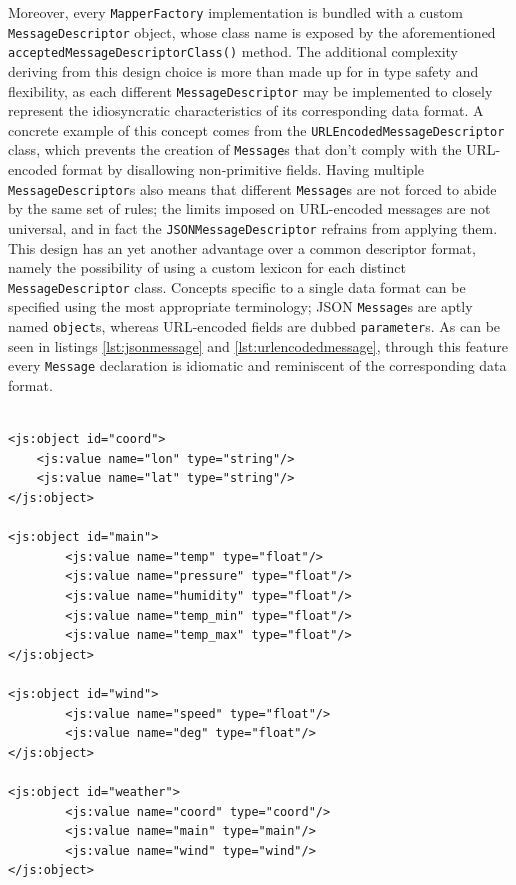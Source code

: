 Moreover, every \texttt{MapperFactory} implementation is bundled with a custom
\texttt{MessageDescriptor} object, whose class name is exposed by the
aforementioned \texttt{acceptedMessageDescriptorClass()} method. The additional
complexity deriving from this design choice is more than made up for in type
safety and flexibility, as each different \texttt{MessageDescriptor} may be
implemented to closely represent the idiosyncratic characteristics of its
corresponding data format. A concrete example of this concept comes from the
\texttt{URLEncodedMessageDescriptor} class, which prevents the creation of
\texttt{Message}s that don't comply with the URL-encoded format by disallowing
non-primitive fields. Having multiple \texttt{MessageDescriptor}s also means
that different \texttt{Message}s are not forced to abide by the same set of
rules; the limits imposed on URL-encoded messages are not universal, and in
fact the \texttt{JSONMessageDescriptor} refrains from applying them. This
design has an yet another advantage over a common descriptor format, namely the
possibility of using a custom lexicon for each distinct
\texttt{MessageDescriptor} class. Concepts specific to a single data format can
be specified using the most appropriate terminology; JSON \texttt{Message}s are
aptly named \texttt{object}s, whereas URL-encoded fields are dubbed
\texttt{parameter}s. As can be seen in listings \ref{lst:jsonmessage} and
\ref{lst:urlencodedmessage}, through this feature every \texttt{Message}
declaration is idiomatic and reminiscent of the corresponding data format. 


\lstset{language=XML}
\begin{lstlisting}[float,floatplacement=!hbt,caption={A compound JSON message
        declared using the JSONMessageDescriptor (XML notation). Note that the
        data type of all fields inside \texttt{weather} message is a reference
        to a previously declared \texttt{Message}.
},label={lst:jsonmessage}]

<js:object id="coord">
    <js:value name="lon" type="string"/>
    <js:value name="lat" type="string"/>
</js:object>

<js:object id="main">
        <js:value name="temp" type="float"/>
        <js:value name="pressure" type="float"/>
        <js:value name="humidity" type="float"/>
        <js:value name="temp_min" type="float"/>
        <js:value name="temp_max" type="float"/>
</js:object>

<js:object id="wind">
        <js:value name="speed" type="float"/>
        <js:value name="deg" type="float"/>
</js:object>

<js:object id="weather">
        <js:value name="coord" type="coord"/>
        <js:value name="main" type="main"/>
        <js:value name="wind" type="wind"/>
</js:object>

\end{lstlisting}


